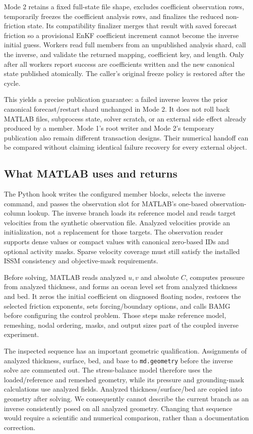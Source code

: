 \documentclass[11pt,a4paper]{article}
\newcommand{\code}[1]{\nolinkurl{#1}}
\begin{document}
Mode 2 retains a fixed full-state file shape, excludes coefficient observation rows, temporarily freezes the coefficient analysis rows, and finalizes the reduced non-friction state. Its compatibility finalizer merges that result with saved forecast friction so a provisional EnKF coefficient increment cannot become the inverse initial guess. Workers read full members from an unpublished analysis shard, call the inverse, and validate the returned mapping, coefficient key, and length. Only after all workers report success are coefficients written and the new canonical state published atomically. The caller's original freeze policy is restored after the cycle.

This yields a precise publication guarantee: a failed inverse leaves the prior canonical forecast/restart shard unchanged in Mode 2. It does not roll back MATLAB files, subprocess state, solver scratch, or an external side effect already produced by a member. Mode 1's root writer and Mode 2's temporary publication also remain different transaction designs. Their numerical handoff can be compared without claiming identical failure recovery for every external object.

\subsection{What MATLAB uses and returns}
The Python hook writes the configured member blocks, selects the inverse command, and passes the observation slot for MATLAB's one-based observation-column lookup. The inverse branch loads its reference model and reads target velocities from the synthetic observation file. Analyzed velocities provide an initialization, not a replacement for those targets. The observation reader supports dense values or compact values with canonical zero-based IDs and optional activity masks. Sparse velocity coverage must still satisfy the installed ISSM consistency and objective-mask requirements.

Before solving, MATLAB reads analyzed \(u,v\) and absolute \(C\), computes pressure from analyzed thickness, and forms an ocean level set from analyzed thickness and bed. It zeros the initial coefficient on diagnosed floating nodes, restores the selected friction exponents, sets forcing/boundary options, and calls BAMG before configuring the control problem. Those steps make reference model, remeshing, nodal ordering, masks, and output sizes part of the coupled inverse experiment.

The inspected sequence has an important geometric qualification. Assignments of analyzed thickness, surface, bed, and base to \code{md.geometry} before the inverse solve are commented out. The stress-balance model therefore uses the loaded/reference and remeshed geometry, while its pressure and grounding-mask calculations use analyzed fields. Analyzed thickness/surface/bed are copied into geometry after solving. We consequently cannot describe the current branch as an inverse consistently posed on all analyzed geometry. Changing that sequence would require a scientific and numerical comparison, rather than a documentation correction.
\end{document}

